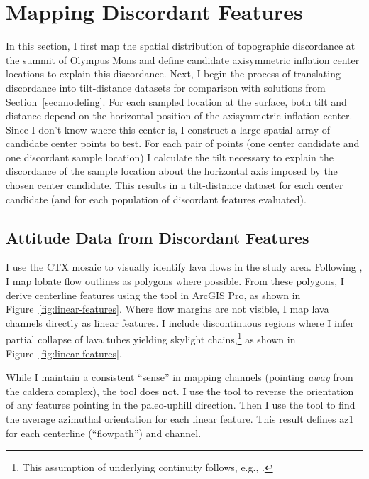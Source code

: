 \section{Mapping Discordant Features}\label{sec:mapping}

In this section, I first map the spatial distribution of topographic discordance at the summit of Olympus Mons and define candidate axisymmetric inflation center locations to explain this discordance. Next, I begin the process of translating discordance into tilt-distance datasets for comparison with solutions from Section~\ref{sec:modeling}. For each sampled location at the surface, both tilt and distance depend on the horizontal position of the axisymmetric inflation center. Since I don't know where this center is, I construct a large spatial array of candidate center points to test. For each pair of points (one center candidate and one discordant sample location) I calculate the tilt necessary to explain the discordance of the sample location about the horizontal axis imposed by the chosen center candidate. This results in a tilt-distance dataset for each center candidate (and for each population of discordant features evaluated).

\subsection{Attitude Data from Discordant Features}\label{sec:attitude-data}

I use the \ac{CTX} mosaic to visually identify lava flows in the study area. Following \textcite{mouginis-mark_geologic_2021}, I map lobate flow outlines as polygons where possible. From these polygons, I derive centerline features using the  tool in ArcGIS Pro, as shown in Figure~\ref{fig:linear-features}. Where flow margins are not visible, I map lava channels directly as linear features. I include discontinuous regions where I infer partial collapse of lava tubes yielding skylight chains,\footnote{This assumption of underlying continuity follows, e.g., \textcite{bleacher_olympus_2007,carr_geologic_2010,peters_lava_2021}.} as shown in Figure~\ref{fig:linear-features}.

While I maintain a consistent ``sense'' in mapping channels (pointing \emph{away} from the caldera complex), the  tool does not. I use the  tool to reverse the orientation of any features pointing in the paleo-uphill direction. Then I use the  tool to find the average azimuthal orientation for each linear feature. This result defines \acf{az1} for each centerline (``flowpath'') and channel.

